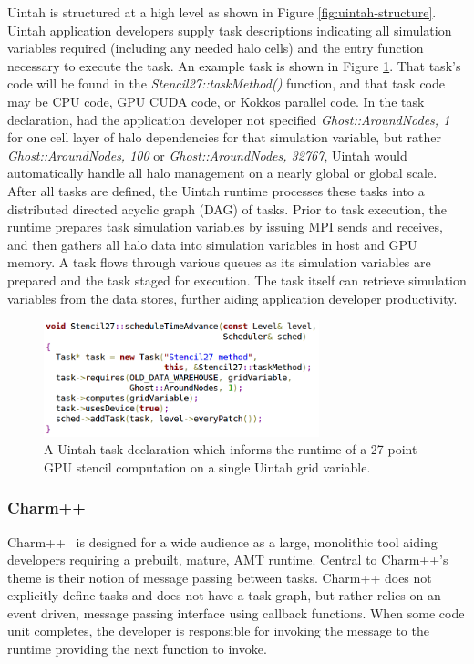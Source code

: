 \documentclass[12pt]{article}
\begin{document}
Uintah is structured at a high level as shown in Figure \ref{fig:uintah-structure}. Uintah application developers supply task descriptions indicating all simulation variables required (including any needed halo cells) and the entry function necessary to execute the task.  An example task is shown in Figure \ref{fig:stencil27-task}.  That task's code will be found in the \emph{Stencil27::taskMethod()} function, and that task code may be CPU code, GPU CUDA code, or Kokkos parallel code.  In the task declaration, had the application developer not specified \emph{Ghost::AroundNodes, 1} for one cell layer of halo dependencies for that simulation variable, but rather \emph{Ghost::AroundNodes, 100} or \emph{Ghost::AroundNodes, 32767}, Uintah would automatically handle all halo management on a nearly global or global scale.  After all tasks are defined, the Uintah runtime processes these tasks into a distributed directed acyclic graph (DAG) of tasks.  Prior to task execution, the runtime prepares task simulation variables by issuing MPI sends and receives, and then gathers all halo data into simulation variables in host and GPU memory.  A task flows through various queues as its simulation variables are prepared and the task staged for execution.  The task itself can retrieve simulation variables from the data stores, further aiding application developer productivity.


\begin{figure}
	\centering
	\includegraphics[width=8cm]{figures/stencil27-task.png}
	\caption{A Uintah task declaration which informs the runtime of a 27-point GPU stencil computation on a single Uintah grid variable.}
	\label{fig:stencil27-task}
\end{figure}



\subsubsection{Charm++}
\label{ch:charmpp}
Charm++~\cite{charmpp1993} is designed for a wide audience as a large, monolithic tool aiding developers requiring a prebuilt, mature, AMT runtime. Central to Charm++'s theme is their notion of message passing between tasks.  Charm++ does not explicitly define tasks and does not have a task graph, but rather relies on an event driven, message passing interface using callback functions.  When some code unit completes, the developer is responsible for invoking the message to the runtime providing the next function to invoke.  
\end{document}
